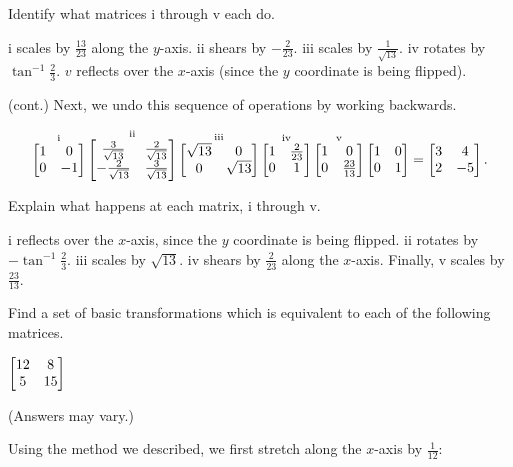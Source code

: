 \documentclass[../gatm_answers.tex]{subfiles}
\begin{document}
\begin{iinner_problem}
\begin{iinner_problem}
\begin{iinner_problem}
\begin{inner_problem}[start=1]
\item Identify what matrices i through v each do.
\end{inner_problem}

i scales by $\frac{13}{23}$ along the $y$-axis. ii shears by $-\frac{2}{23}$. iii scales by $\frac{1}{\sqrt{13}}$. iv rotates by $\tan^{-1} \frac{2}{3}$. $v$ reflects over the $x$-axis (since the $y$ coordinate is being flipped).

\begin {outer_problem} %
\setcounter{outer_problemi}{\value{problem_i}}
\item (cont.) Next, we undo this sequence of operations by working backwards.
\end {outer_problem}

\vspace{-2ex}
$$\mathop{\begin{bmatrix} 1 & 0 \\ 0 & -1 \end{bmatrix}}^{\text{i}}
\mathop{\begin{bmatrix} \frac{3}{\sqrt{13}} & \frac{2}{\sqrt{13}} \\ -\frac{2}{\sqrt{13}} & \frac{3}{\sqrt{13}} \end{bmatrix}}^{\text{ii}}
\mathop{\begin{bmatrix} \sqrt{13} & 0 \\ 0 & \sqrt{13} \end{bmatrix}}^{\text{iii}}
\mathop{\begin{bmatrix} 1 & \frac{2}{23} \\ 0 & 1 \end{bmatrix}}^{\text{iv}}
\mathop{\begin{bmatrix} 1 & 0 \\ 0 & \frac{23}{13} \end{bmatrix}}^{\text{v}}
\begin{bmatrix} 1 & 0 \\ 0 & 1 \end{bmatrix}=\begin{bmatrix} 3 & 4 \\ 2 & -5 \end{bmatrix}.$$

\begin{inner_problem}
\item Explain what happens at each matrix, i through v.
\end{inner_problem}

i reflects over the $x$-axis, since the $y$ coordinate is being flipped. ii rotates by $-\tan^{-1} \frac{2}{3}$. iii scales by $\sqrt{13}$. iv shears by $\frac{2}{23}$ along the $x$-axis. Finally, v scales by $\frac{23}{13}$.

\begin{outer_problem}
\item Find a set of basic transformations which is equivalent to each of the following matrices.\label{prob:basic_transformations}
\end{outer_problem}

\begin{inner_problem}[start=1]
\item $\begin{bmatrix} 12 & 8 \\ 5 & 15 \end{bmatrix}$
\end{inner_problem}

(Answers may vary.)

Using the method we described, we first stretch along the $x$-axis by $\frac{1}{12}$:


\end{iinner_problem}
\end{iinner_problem}
\end{iinner_problem}
\end{document}
